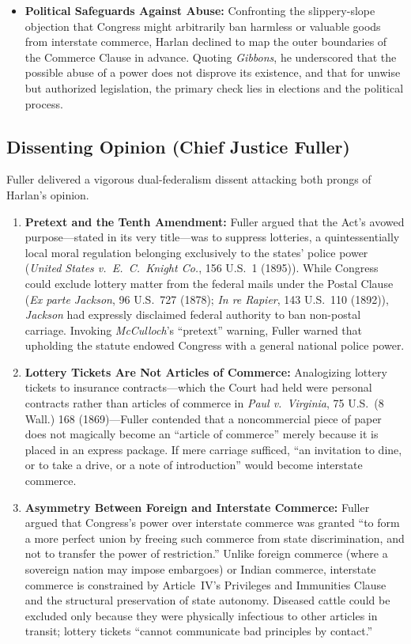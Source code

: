 \documentclass[12pt]{article}
\begin{document}
\begin{itemize}
  \item \textbf{Political Safeguards Against Abuse:} Confronting the slippery-slope objection that Congress might arbitrarily ban harmless or valuable goods from interstate commerce, Harlan declined to map the outer boundaries of the Commerce Clause in advance. Quoting \textit{Gibbons}, he underscored that the possible abuse of a power does not disprove its existence, and that for unwise but authorized legislation, the primary check lies in elections and the political process.
\end{itemize}

\subsection{Dissenting Opinion (Chief Justice Fuller)}

Fuller delivered a vigorous dual-federalism dissent attacking both prongs of Harlan's opinion.
\begin{enumerate}
  \item \textbf{Pretext and the Tenth Amendment:} Fuller argued that the Act's avowed purpose---stated in its very title---was to suppress lotteries, a quintessentially local moral regulation belonging exclusively to the states' police power (\textit{United States v.\ E.\ C.\ Knight Co.}, 156 U.S.\ 1 (1895)). While Congress could exclude lottery matter from the federal mails under the Postal Clause (\textit{Ex parte Jackson}, 96 U.S.\ 727 (1878); \textit{In re Rapier}, 143 U.S.\ 110 (1892)), \textit{Jackson} had expressly disclaimed federal authority to ban non-postal carriage. Invoking \textit{McCulloch}'s ``pretext'' warning, Fuller warned that upholding the statute endowed Congress with a general national police power.
  \item \textbf{Lottery Tickets Are Not Articles of Commerce:} Analogizing lottery tickets to insurance contracts---which the Court had held were personal contracts rather than articles of commerce in \textit{Paul v.\ Virginia}, 75 U.S.\ (8 Wall.) 168 (1869)---Fuller contended that a noncommercial piece of paper does not magically become an ``article of commerce'' merely because it is placed in an express package. If mere carriage sufficed, ``an invitation to dine, or to take a drive, or a note of introduction'' would become interstate commerce.
  \item \textbf{Asymmetry Between Foreign and Interstate Commerce:} Fuller argued that Congress's power over interstate commerce was granted ``to form a more perfect union by freeing such commerce from state discrimination, and not to transfer the power of restriction.'' Unlike foreign commerce (where a sovereign nation may impose embargoes) or Indian commerce, interstate commerce is constrained by Article~IV's Privileges and Immunities Clause and the structural preservation of state autonomy. Diseased cattle could be excluded only because they were physically infectious to other articles in transit; lottery tickets ``cannot communicate bad principles by contact.''
\end{enumerate}
\end{document}
